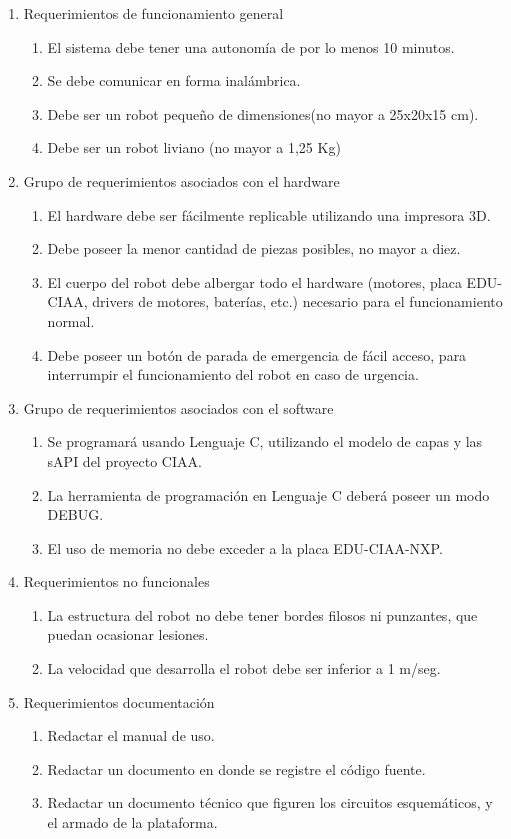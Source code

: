 \documentclass[11pt]{charter}
\begin{document}
\begin{enumerate}
\item Requerimientos de funcionamiento general
	\begin{enumerate}
	\item El sistema debe tener una autonomía de por lo menos 10 minutos.
	\item Se debe comunicar en forma inalámbrica. 
	\item Debe ser un robot pequeño de dimensiones(no mayor a 25x20x15 cm).
	\item Debe ser un robot liviano (no mayor a 1,25 Kg)
	\end{enumerate}
\item Grupo de requerimientos asociados con el hardware
	\begin{enumerate}
	\item El hardware debe ser fácilmente replicable utilizando una impresora 3D.
	\item Debe poseer la menor cantidad de piezas posibles, no mayor a diez. 
	\item El cuerpo del robot debe albergar todo el hardware (motores, placa EDU-CIAA, drivers de motores, baterías, etc.) necesario para el funcionamiento normal.
	\item Debe poseer un botón de parada de emergencia de fácil acceso, para interrumpir el funcionamiento del robot en caso de urgencia.
	\end{enumerate}
\item Grupo de requerimientos asociados con el software
	\begin{enumerate}
	\item Se programará usando Lenguaje C, utilizando el modelo de capas y las sAPI del proyecto CIAA.
	\item La herramienta de programación en Lenguaje C deberá poseer un modo DEBUG.
	\item El uso de memoria no debe exceder a la placa EDU-CIAA-NXP.
	\end{enumerate}
\item Requerimientos no funcionales
	\begin{enumerate}
	\item La estructura del robot no debe tener bordes filosos ni punzantes, que puedan ocasionar lesiones. 
	\item La velocidad que desarrolla el robot debe ser inferior a 1 m/seg.
	\end{enumerate}
\item Requerimientos documentación
	\begin{enumerate}
	\item Redactar el manual de uso. 
	\item Redactar un documento en donde se registre el código 
	fuente.
	\item Redactar un documento técnico que figuren los circuitos
	esquemáticos, y el armado de la plataforma.
	\end{enumerate}
\end{enumerate}
\end{document}
